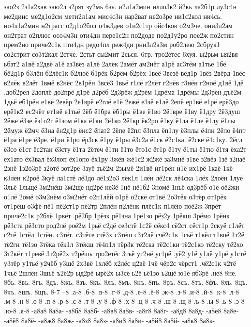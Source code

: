 {зао2з
2з1а2хав
заю2л
з2рят
зу2мь
6зь.
и2л1а2мин
илло3к2
й2кь
ла2б1р
лу3с4н
ме2динс
ме2д1о2см
мети2л1ам
мис4с3н
нар2ват
не2о3ре
ни1с2кол
ни4сь.
но4л1а2мин
н2трасс
о2д1о2бол
о4ж3дев
о1и2с1тр
ойс4ков
о2м3че.
они3л2ам
он2трат
о2плюс
осо4м3н
оти4дн
пере1с2н
по2доде
по2д1у2ро
пое2ж
по2стин
прем2но
приче2с1к
пти4дн
редо4пл
реж4ди
рни3л2а3м
роб2лею
2сбрук1
со2стрит
со3т2кал
2стче.
2стьт
сы2мит
2сься.
6тр.
тро2етес
6хуя.
ы2рьм
ыя2вя
ьбат2
а1вё
а2двё
а1ё
аз3вёз
а1лё
2алёк
2амёт
ам2нёт
а1рё
ас3тём
а1тьё
1бё
бё2д1р
б3лён
б2лёс1к
б2люё
б1рёк
б2рём
б2рёх
1веё
3везё
вёд1р
1вёз
2вёрд
1вёс
в2лёк
в2лёт
1вмё
в2нёс
2в1рён
3всё3
1вьё
г1лё
г2лёт
г2нёв
г3нён
г2ноё
д1вё
1дё
.доб2рёл
2доплё
до2прё
д1рё
д2рёб
2д3рёж
д2рём
1дрёма
1дрёмы
2д3рён
дъё2м
1дьё
еб1рён
е1вё
2евёр
2е1врё
е2глё
е1ё
2ежё
е3зё
е1лё
2епё
ер1вё
е1рё
ерё3до
ерё1к2
ес2чёт
ет1вё
е1тьё
2ёб
ё1бра
ёб1ры
ё1ве
ё1во
2ё1вре
ё1ву
ё1дру
2ё3душ
2ёже
ё3зе
ёз1о2г
ё1зом
ё1ка
ё1ки
2ё1ко
2ё1кр
ёк2ро
ё1ку
ё1ла
ё1ле
ё1лу
ё1лы
2ёмуж
ё2мч
ё3на
ён2д1р
ёнс2
ёпат2
2ёпе
ё2пл
ё3пла
ёп1лу
ё3плы
ё4пн
2ёпо
ё4пт
ё1ра
ё1ре
ё3ре.
ё1ри
ё1ро
ёр3ск
ё1ру
ё1ры
ё3с2а
ё1ск
ё2с1ка.
ё2ске
ё4с1ку.
2ёсл
ё3со
ё1ст
ёс2тан
ё3сту
ё1та
2ётеч
ё1ти
ё1то
ёто1с
ёт1р
ё1ту
ё1ты
ё1тю
ё1тя
ёха2т
ёх1ато
ёх3вал
ёх3лоп
ёх1опо
ёх1ру
3жёв
жё1с2
ж2жё
за3мнё
з1вё
з2вёз
1зё
з2наё
2знё
1з2о3рё
з2отё
зот2рё
3зуё
зъё2м
2зымё
2и1вё
иг1рён
и1ё
их1рё
1каё
1кё
к3лён
к2роё
3куё
ла1стё
лё3до
лё1з2о3
лёк1л
1лён
лё2ск
лё4ска
1лёх
2лоён
1луё
3льё
1льщё
3м2нёш
3м2щё
нд2рё
не3ё
1нё
нё1б2
3номё
1ньё
од3рёб
о1ё
оё2жи
о1лё
2омё
о3м2нём
о3м2нёт
о2п1лёй
о1рё
о2скё
от1вё
2о3тёк
о3тёр
от1рёк
от1рёш
о3фё
пё1
пё2ст1р
пё2тр
2плён
п2лёнк
плёс1к
п1лёю
поё2ж
3прёт
причё2с1к
р2блё
1рвёт
.рё2бр
1рёзк
рё1зна
1рё1зо
рёз2у
1рёкш
3рёмо
1рёнк
рё3ста
рё3сто
род2лё
роё2м
1рьё
с2дё
се3стё
1с2ё
сёкс4
сё2ст
сёст1р
2скуё
с1лёт
с2тё
1стёл
1стён.
с3тёт.
с3тёте
стё3х
с3тёш
с3т2лё
счё2с1к
1сьё
т1вёл
т1воё
1т2ё
тё2гн
тё1зо
3тёка
тёк1л
3тёкш
тё4п1л
тёр3к
тё2ска
тё2с1ки
тё2с1ко
тё2ску
тё2хо
3т2кёт
т1ревё
3т2рё2х
т2рёшь
тро2етёс
3тьё
уг2нё
уг1рё
.уё2
у1ё
у1лё
у1рё
у1стё
у3тёр
у1тьё
у2чёб
у3шё
2х3вё
1хлёб
х2лёс
ц2вё
1чё
чёр2с
чёрст1
.чё2с1к
ч2тё
1чьё
2шлён
3шьё
ъ2ё2р
ыд2рё
ырё2х
ы3сё
ь2ё
ьё1зо
ь2щё
ю1ё
яб3рё
.не8
8не.
8бъ.
8въ.
8гъ.
8дъ.
8жъ.
8зъ.
8къ.
8лъ.
8мъ.
8нъ.
8пъ.
8ръ.
8съ.
8тъ.
8фъ.
8хъ.
8цъ.
8чъ.
8шъ.
8щъ.
8-7
--8
.а-8
.б-8
.в-8
.г-8
.д-8
.е-8
.ё-8
.ж-8
.з-8
.и-8
.й-8
.к-8
.л-8
.м-8
.н-8
.о-8
.п-8
.р-8
.с-8
.т-8
.у-8
.ф-8
.х-8
.ц-8
.ч-8
.ш-8
.щ-8
.ъ-8
.ы-8
.ь-8
.э-8
.ю-8
.я-8
-а8а8
8а8а-
-а8б8
8а8б-
-а8в8
8а8в-
-а8г8
8а8г-
-а8д8
8а8д-
-а8е8
8а8е-
-а8ё8
8а8ё-
-а8ж8
8а8ж-
-а8з8
8а8з-
-а8и8
8а8и-
-а8й8
8а8й-
-а8к8
8а8к-
}
